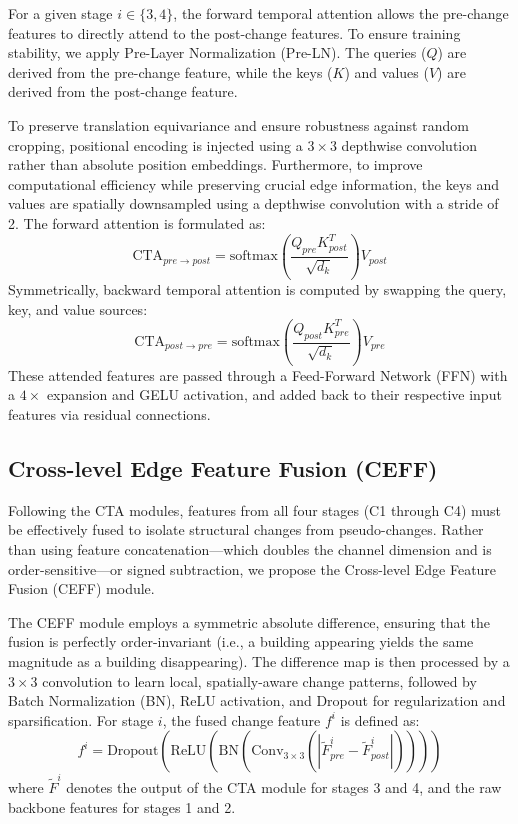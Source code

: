 \documentclass[conference]{IEEEtran}
\begin{document}
For a given stage $i \in \{3, 4\}$, the forward temporal attention allows the pre-change features to directly attend to the post-change features. To ensure training stability, we apply Pre-Layer Normalization (Pre-LN). The queries ($Q$) are derived from the pre-change feature, while the keys ($K$) and values ($V$) are derived from the post-change feature. 

To preserve translation equivariance and ensure robustness against random cropping, positional encoding is injected using a $3 \times 3$ depthwise convolution rather than absolute position embeddings. Furthermore, to improve computational efficiency while preserving crucial edge information, the keys and values are spatially downsampled using a depthwise convolution with a stride of 2. The forward attention is formulated as:
\begin{equation}
\text{CTA}_{pre \to post} = \text{softmax}\left(\frac{Q_{pre}K_{post}^T}{\sqrt{d_k}}\right)V_{post}
\end{equation}
Symmetrically, backward temporal attention is computed by swapping the query, key, and value sources:
\begin{equation}
\text{CTA}_{post \to pre} = \text{softmax}\left(\frac{Q_{post}K_{pre}^T}{\sqrt{d_k}}\right)V_{pre}
\end{equation}
These attended features are passed through a Feed-Forward Network (FFN) with a $4\times$ expansion and GELU activation, and added back to their respective input features via residual connections.

\subsection{Cross-level Edge Feature Fusion (CEFF)}

Following the CTA modules, features from all four stages (C1 through C4) must be effectively fused to isolate structural changes from pseudo-changes. Rather than using feature concatenation—which doubles the channel dimension and is order-sensitive—or signed subtraction, we propose the Cross-level Edge Feature Fusion (CEFF) module. 

The CEFF module employs a symmetric absolute difference, ensuring that the fusion is perfectly order-invariant (i.e., a building appearing yields the same magnitude as a building disappearing). The difference map is then processed by a $3 \times 3$ convolution to learn local, spatially-aware change patterns, followed by Batch Normalization (BN), ReLU activation, and Dropout for regularization and sparsification. For stage $i$, the fused change feature $f^i$ is defined as:
\begin{equation}
f^i = \text{Dropout}\left(\text{ReLU}\left(\text{BN}\left(\text{Conv}_{3\times3}\left(| \tilde{F}_{pre}^{i} - \tilde{F}_{post}^{i} |\right)\right)\right)\right)
\end{equation}
where $\tilde{F}^i$ denotes the output of the CTA module for stages 3 and 4, and the raw backbone features for stages 1 and 2.
\end{document}
